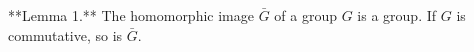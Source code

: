 **Lemma 1.** The homomorphic image $\bar{G}$ of a group $G$ is a group. If $G$ is commutative, so is $\bar{G}$.
